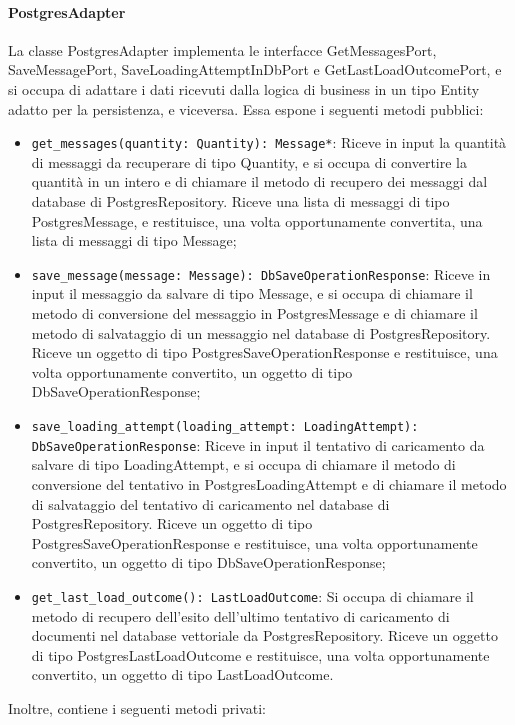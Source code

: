 \paragraph{PostgresAdapter}
\label{sec:postgres_adapter}
La classe PostgresAdapter implementa le interfacce GetMessagesPort, SaveMessagePort, SaveLoadingAttemptInDbPort e GetLastLoadOutcomePort, e si occupa di adattare i dati ricevuti dalla logica di business in un tipo Entity adatto per la persistenza, e viceversa. Essa espone i seguenti metodi pubblici:
\begin{itemize}
    \item \texttt{get\_messages(quantity: Quantity): Message*}: Riceve in input la quantità di messaggi da recuperare di tipo Quantity, e si occupa di convertire la quantità in un intero e di chiamare il metodo di recupero dei messaggi dal database di PostgresRepository. Riceve una lista di messaggi di tipo PostgresMessage, e restituisce, una volta opportunamente convertita, una lista di messaggi di tipo Message;
    \item \texttt{save\_message(message: Message): DbSaveOperationResponse}: Riceve in input il messaggio da salvare di tipo Message, e si occupa di chiamare il metodo di conversione del messaggio in PostgresMessage e di chiamare il metodo di salvataggio di un messaggio nel database di PostgresRepository. Riceve un oggetto di tipo PostgresSaveOperationResponse e restituisce, una volta opportunamente convertito, un oggetto di tipo DbSaveOperationResponse;
    \item \texttt{save\_loading\_attempt(loading\_attempt: LoadingAttempt): DbSaveOperationResponse}: Riceve in input il tentativo di caricamento da salvare di tipo LoadingAttempt, e si occupa di chiamare il metodo di conversione del tentativo in PostgresLoadingAttempt e di chiamare il metodo di salvataggio del tentativo di caricamento nel database di PostgresRepository. Riceve un oggetto di tipo PostgresSaveOperationResponse e restituisce, una volta opportunamente convertito, un oggetto di tipo DbSaveOperationResponse;
    \item \texttt{get\_last\_load\_outcome(): LastLoadOutcome}: Si occupa di chiamare il metodo di recupero dell'esito dell'ultimo tentativo di caricamento di documenti nel database vettoriale da PostgresRepository. Riceve un oggetto di tipo PostgresLastLoadOutcome e restituisce, una volta opportunamente convertito, un oggetto di tipo LastLoadOutcome.
\end{itemize}
Inoltre, contiene i seguenti metodi privati:

